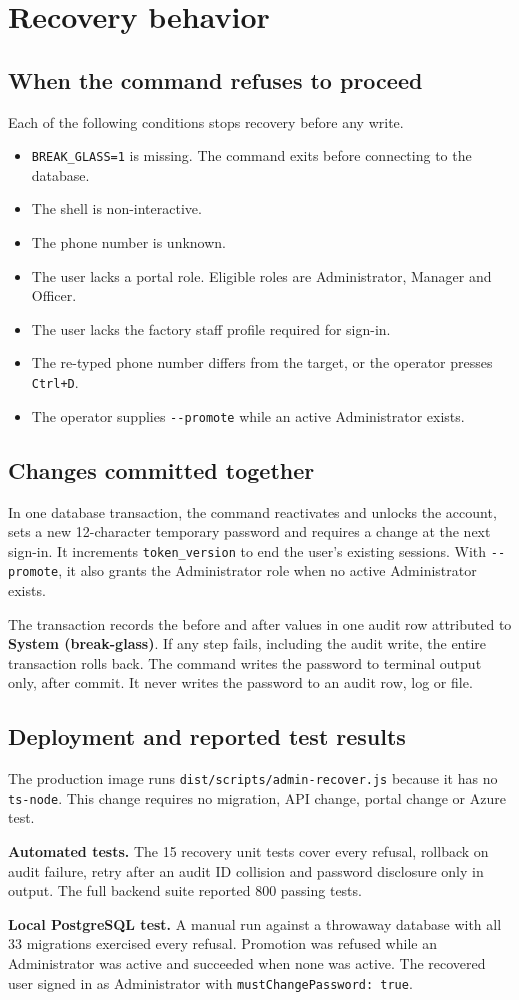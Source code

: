 \documentclass[11pt,a4paper]{article}
\begin{document}
\newpage
\section*{Recovery behavior}
\subsection*{When the command refuses to proceed}
Each of the following conditions stops recovery before any write.
\begin{itemize}
\item \verb|BREAK_GLASS=1| is missing. The command exits before connecting to the database.
\item The shell is non-interactive.
\item The phone number is unknown.
\item The user lacks a portal role. Eligible roles are Administrator, Manager and Officer.
\item The user lacks the factory staff profile required for sign-in.
\item The re-typed phone number differs from the target, or the operator presses \texttt{Ctrl+D}.
\item The operator supplies \verb|--promote| while an active Administrator exists.
\end{itemize}

\subsection*{Changes committed together}
In one database transaction, the command reactivates and unlocks the account, sets a new 12-character temporary password and requires a change at the next sign-in. It increments \verb|token_version| to end the user's existing sessions. With \verb|--promote|, it also grants the Administrator role when no active Administrator exists.

The transaction records the before and after values in one audit row attributed to \textbf{System (break-glass)}. If any step fails, including the audit write, the entire transaction rolls back. The command writes the password to terminal output only, after commit. It never writes the password to an audit row, log or file.

\subsection*{Deployment and reported test results}
The production image runs \verb|dist/scripts/admin-recover.js| because it has no \texttt{ts-node}. This change requires no migration, API change, portal change or Azure test.

\textbf{Automated tests.} The 15 recovery unit tests cover every refusal, rollback on audit failure, retry after an audit ID collision and password disclosure only in output. The full backend suite reported 800 passing tests.

\textbf{Local PostgreSQL test.} A manual run against a throwaway database with all 33 migrations exercised every refusal. Promotion was refused while an Administrator was active and succeeded when none was active. The recovered user signed in as Administrator with \verb|mustChangePassword: true|.
\end{document}
